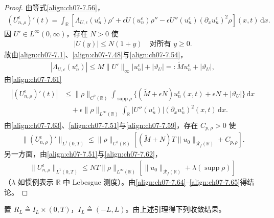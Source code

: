 \documentclass[../../main.tex]{subfiles}%
\begin{document}
\begin{proof}
由等式\eqref{align:ch07-7.56}，
\begin{align}
(U_{n,\rho}^\epsilon)'(t)=\int_{\mathbb{R}}[\Lambda_{U,\epsilon}(u_n^\epsilon)\rho'+\epsilon U(u_n^\epsilon)\rho''-\epsilon U''(u_n^\epsilon)(\partial_x u_n^\epsilon)^2\rho](x,t)\,\mathrm{d}x. \label{align:ch07-7.61}
\end{align}
因 $U'\in L^\infty(0,\infty)$，存在 $N>0$ 使
\begin{align}
|U(y)|\leqslant N(1+y)\quad\text{对所有 }y\geqslant0. \label{align:ch07-7.62}
\end{align}
故由\eqref{align:ch07-7.1}、\eqref{align:ch07-7.48}与\eqref{align:ch07-7.54}，
\begin{align*}
|\Lambda_{U,\epsilon}(u_n^\epsilon)|\leqslant M\|U'\|_\infty|u_n^\epsilon|+|\vartheta_U|=:\widetilde M u_n^\epsilon+|\vartheta_U|,
\end{align*}
由\eqref{align:ch07-7.61}
\begin{align}
\begin{aligned}
|(U_{n,\rho}^\epsilon)'(t)|&\leqslant\|\rho\|_{C^2(\mathbb{R})}\int_{\operatorname{supp}\rho}\{(\widetilde M+\epsilon N)u_n^\epsilon(x,t)+\epsilon N+|\vartheta_U|\}\,\mathrm{d}x\\
&\quad+\epsilon\|\rho\|_{L^\infty(\mathbb{R})}\int_{\mathbb{R}}|U''(u_n^\epsilon)|(\partial_x u_n^\epsilon)^2(x,t)\,\mathrm{d}x.
\end{aligned} \label{align:ch07-7.63}
\end{align}
由\eqref{align:ch07-7.63}、\eqref{align:ch07-7.51}与\eqref{align:ch07-7.59}，存在 $C_{p,\rho}>0$ 使
\begin{align}
\|(U_{n,\rho}^\epsilon)'\|_{L^1(0,T)}\leqslant\|\rho\|_{C^2(\mathbb{R})}[(\widetilde M+N)T\|u_0\|_{\mathscr{R}_f(\mathbb{R})}+C_{p,\rho}]. \label{align:ch07-7.64}
\end{align}
另一方面，由\eqref{align:ch07-7.51}与\eqref{align:ch07-7.62}，
\begin{align}
\|U_{n,\rho}^\epsilon\|_{L^1(0,T)}\leqslant NT\|\rho\|_{L^\infty(\mathbb{R})}[\|u_0\|_{\mathscr{R}_f(\mathbb{R})}+\lambda(\operatorname{supp}\rho)] \label{align:ch07-7.65}
\end{align}
（$\lambda$ 如惯例表示 $\mathbb{R}$ 中 Lebesgue 测度）。由\eqref{align:ch07-7.64}--\eqref{align:ch07-7.65}得结论。
\end{proof}

置 $R_L\triangleq I_L\times(0,T)$，$I_L\triangleq (-L,L)$。由上述引理得下列收敛结果。
\end{document}

